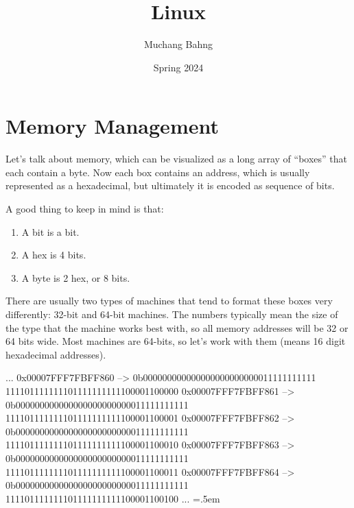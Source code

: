 \documentclass{article}
\theoremstyle{definition}
\newenvironment{cverbatim}
   {\SaveVerbatim{cverb}}
   {\endSaveVerbatim
    \flushleft\fboxrule=0pt\fboxsep=.5em
    \colorbox{cverbbg}{%
      \makebox[\dimexpr\linewidth-2\fboxsep][l]{\BUseVerbatim{cverb}}%
    }
    \endflushleft
  }
\begin{document}
\pagestyle{fancy}

\cfoot{\thepage / \pageref{LastPage}}


\title{Linux}
\author{Muchang Bahng}
\date{Spring 2024}

\maketitle

\tableofcontents

\pagebreak 

\section{Memory Management} 


  Let's talk about memory, which can be visualized as a long array of ``boxes'' that each contain a byte. Now each box contains an address, which is usually represented as a hexadecimal, but ultimately it is encoded as sequence of bits. 

  A good thing to keep in mind is that: 
  \begin{enumerate} 
    \item A bit is a bit. 
    \item A hex is 4 bits. 
    \item A byte is 2 hex, or 8 bits. 
  \end{enumerate}

  There are usually two types of machines that tend to format these boxes very differently: 32-bit and 64-bit machines. The numbers typically mean the size of the type that the machine works best with, so all memory addresses will be 32 or 64 bits wide. Most machines are 64-bits, so let's work with them (means 16 digit hexadecimal addresses). 

  \begin{cverbatim} 
    ...
    0x00007FFF7FBFF860 --> 0b000000000000000000000000011111111111
                           111101111111101111111111100001100000
    0x00007FFF7FBFF861 --> 0b000000000000000000000000011111111111
                           111101111111101111111111100001100001
    0x00007FFF7FBFF862 --> 0b000000000000000000000000011111111111
                           111101111111101111111111100001100010
    0x00007FFF7FBFF863 --> 0b000000000000000000000000011111111111
                           111101111111101111111111100001100011
    0x00007FFF7FBFF864 --> 0b000000000000000000000000011111111111
                           111101111111101111111111100001100100
    ...
  \end{cverbatim}
\end{document}
